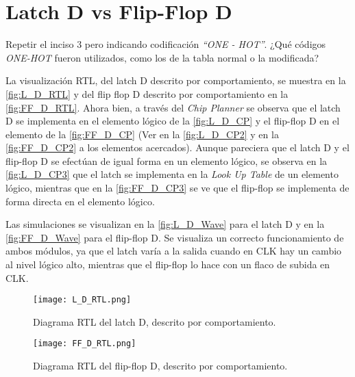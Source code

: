 \section{Latch D vs Flip-Flop D \label{sec:s4}}

\begin{center}
	\begin{minipage}{12cm}
		\begin{tcolorbox}[title=Actividad 4]
			Repetir el inciso 3 pero indicando codificación \textit{``ONE - HOT''}. ¿Qué códigos \textit{ONE-HOT} fueron utilizados, como los de la tabla normal o la modificada?
		\end{tcolorbox}	
	\end{minipage}
\end{center}

La visualización RTL, del latch D descrito por comportamiento, se muestra en la \autoref{fig:L_D_RTL} y del flip flop D descrito por comportamiento en la \autoref{fig:FF_D_RTL}. Ahora bien, a través del \textit{Chip Planner} se observa que el latch D se implementa en el elemento lógico de la \autoref{fig:L_D_CP} y el flip-flop D en el elemento de la \autoref{fig:FF_D_CP} (Ver en la \autoref{fig:L_D_CP2} y en la \autoref{fig:FF_D_CP2} a los elementos acercados). Aunque pareciera que el latch D y el flip-flop D se efectúan de igual forma en un elemento lógico, se observa en la \autoref{fig:L_D_CP3} que el latch se implementa en la \textit{Look Up Table} de un elemento lógico, mientras que en la \autoref{fig:FF_D_CP3} se ve que el flip-flop se implementa de forma directa en el elemento lógico.

Las simulaciones se visualizan en la \autoref{fig:L_D_Wave} para el latch D y en la \autoref{fig:FF_D_Wave} para el flip-flop D. Se visualiza un correcto funcionamiento de ambos módulos, ya que el latch varía a la salida cuando en CLK hay un cambio al nivel lógico alto, mientras que el flip-flop lo hace con un flaco de subida en CLK.

\begin{figure}[ht]
	\centering
	\texttt{[image: L\_D\_RTL.png]}
	\caption{Diagrama RTL del latch D, descrito por comportamiento. \label{fig:L_D_RTL}}
\end{figure}

\begin{figure}[ht]
	\centering
	\texttt{[image: FF\_D\_RTL.png]}
	\caption{Diagrama RTL del flip-flop D, descrito por comportamiento. \label{fig:FF_D_RTL}}
\end{figure}

